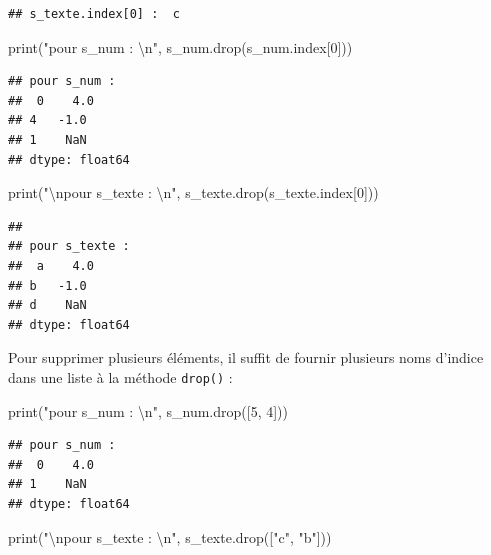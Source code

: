 \documentclass[12pt,]{book}
\newenvironment{Shaded}{\begin{snugshade}}{\end{snugshade}}
\newcommand{\DecValTok}[1]{\textcolor[rgb]{0.00,0.00,0.81}{#1}}
\newcommand{\CharTok}[1]{\textcolor[rgb]{0.31,0.60,0.02}{#1}}
\newcommand{\StringTok}[1]{\textcolor[rgb]{0.31,0.60,0.02}{#1}}
\newcommand{\BuiltInTok}[1]{#1}
\newcommand{\NormalTok}[1]{#1}
\numberwithin{equation}{section}
\numberwithin{countremarque}{section}
\begin{document}
\begin{lstlisting}
## s_texte.index[0] :  c
\end{lstlisting}

\begin{Shaded}
\begin{Highlighting}[]
\BuiltInTok{print}\NormalTok{(}\StringTok{"pour s_num : }\CharTok{\textbackslash{}n}\StringTok{"}\NormalTok{, s_num.drop(s_num.index[}\DecValTok{0}\NormalTok{]))}
\end{Highlighting}
\end{Shaded}

\begin{lstlisting}
## pour s_num : 
##  0    4.0
## 4   -1.0
## 1    NaN
## dtype: float64
\end{lstlisting}

\begin{Shaded}
\begin{Highlighting}[]
\BuiltInTok{print}\NormalTok{(}\StringTok{"}\CharTok{\textbackslash{}n}\StringTok{pour s_texte : }\CharTok{\textbackslash{}n}\StringTok{"}\NormalTok{, s_texte.drop(s_texte.index[}\DecValTok{0}\NormalTok{]))}
\end{Highlighting}
\end{Shaded}

\begin{lstlisting}
## 
## pour s_texte : 
##  a    4.0
## b   -1.0
## d    NaN
## dtype: float64
\end{lstlisting}

Pour supprimer plusieurs éléments, il suffit de fournir plusieurs noms
d'indice dans une liste à la méthode \texttt{drop()} :

\begin{Shaded}
\begin{Highlighting}[]
\BuiltInTok{print}\NormalTok{(}\StringTok{"pour s_num : }\CharTok{\textbackslash{}n}\StringTok{"}\NormalTok{, s_num.drop([}\DecValTok{5}\NormalTok{, }\DecValTok{4}\NormalTok{]))}
\end{Highlighting}
\end{Shaded}

\begin{lstlisting}
## pour s_num : 
##  0    4.0
## 1    NaN
## dtype: float64
\end{lstlisting}

\begin{Shaded}
\begin{Highlighting}[]
\BuiltInTok{print}\NormalTok{(}\StringTok{"}\CharTok{\textbackslash{}n}\StringTok{pour s_texte : }\CharTok{\textbackslash{}n}\StringTok{"}\NormalTok{, s_texte.drop([}\StringTok{"c"}\NormalTok{, }\StringTok{"b"}\NormalTok{]))}
\end{Highlighting}
\end{Shaded}
\end{document}
